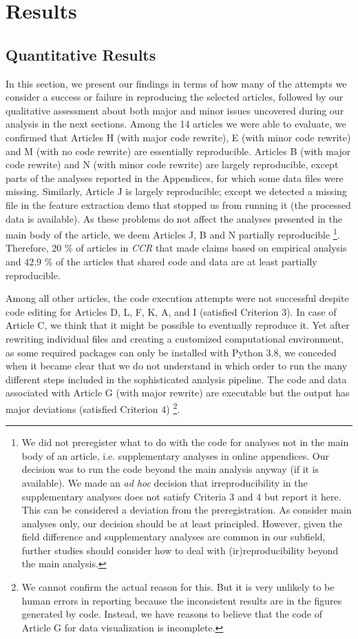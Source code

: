 \section{Results}
\subsection{Quantitative Results}

In this section, we present our findings in terms of how many of the attempts we consider a success or failure in reproducing the selected articles, followed by our qualitative assessment about both major and minor issues uncovered during our analysis in the next sections.
Among the 14 articles we were able to evaluate, we confirmed that Articles H (with major code rewrite), E (with minor code rewrite) and M (with no code rewrite) are essentially reproducible. Articles B (with major code rewrite) and N (with minor code rewrite) are largely reproducible, except parts of the analyses reported in the Appendices, for which some data files were missing. Similarly, Article J is largely reproducible; except we detected a missing file in the feature extraction demo that stopped us from running it (the processed data is available). As these problems do not affect the analyses presented in the main body of the article, we deem Articles J, B and N partially reproducible \footnote{We did not preregister what to do with the code for analyses not in the main body of an article, i.e. supplementary analyses in online appendices. Our decision was to run the code beyond the main analysis anyway (if it is available). We made an \textit{ad hoc} decision that irreproducibility in the supplementary analyses does not satisfy Criteria 3 and 4 but report it here. This can be considered a deviation from the preregistration. As \textcite{cruewell:2023:WB} consider main analyses only, our decision should be at least principled. However, given the field difference and supplementary analyses are common in our subfield, further studies should consider how to deal with (ir)reproducibility beyond the main analysis.}. Therefore, 20 \% of articles in \textit{CCR} that made claims based on empirical analysis and 42.9 \% of the articles that shared code and data are at least partially reproducible.

Among all other articles, the code execution attempts were not successful despite code editing for Articles D, L, F, K, A, and I (satisfied Criterion 3). In case of Article C, we think that it might be possible to eventually reproduce it. Yet after rewriting individual files and creating a customized computational environment, as some required packages can only be installed with Python 3.8, we conceded when it became clear that we do not understand in which order to run the many different steps included in the sophisticated analysis pipeline. The code and data associated with Article G (with major rewrite) are executable but the output has major deviations (satisfied Criterion 4) \footnote{We cannot confirm the actual reason for this. But it is very unlikely to be human errors in reporting because the inconsistent results are in the figures generated by code. Instead, we have reasons to believe that the code  of Article G for data visualization is incomplete.}.

